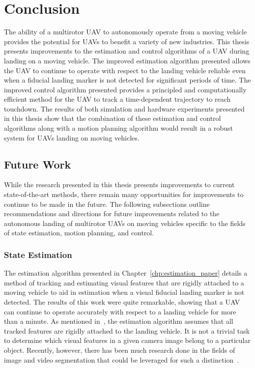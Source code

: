 
\chapter{Conclusion}
\label{chp:conclusion}

The ability of a multirotor UAV to autonomously operate from a moving vehicle
provides the potential for UAVs to benefit a variety of new industries. This
thesis presents improvements to the estimation and control algorithms of a UAV
during landing on a moving vehicle. The improved estimation algorithm presented
allows the UAV to continue to operate with respect to the landing vehicle
reliable even when a fiducial landing marker is not detected for significant
periods of time. The improved control algorithm presented provides a principled
and computationally efficient method for the UAV to track a time-dependent
trajectory to reach touchdown. The results of both simulation and hardware
experiments presented in this thesis show that the combination of these estimation and control
algorithms along with a motion planning algorithm would result in a robust
system for UAVs landing on moving vehicles.

\section{Future Work}
\label{sec:future_work}
While the research presented in this thesis presents improvements to current
state-of-the-art methods, there remain many opportunities for improvements to
continue to be made in the future. The following subsections outline
recommendations and directions for future improvements related to the autonomous
landing of multirotor UAVs on moving vehicles specific to the fields of state
estimation, motion planning, and control.

\subsection{State Estimation}
The estimation algorithm presented in Chapter~\ref{chp:estimation_paper} details
a method of tracking and estimating visual features that are rigidly attached to
a moving vehicle to aid in estimation when a visual fiducial landing marker is
not detected. The results of this work were quite remarkable, showing that a UAV
can continue to operate accurately with respect to a landing vehicle for more
than a minute. As mentioned in~, the estimation algorithm
assumes that all tracked features are rigidly attached to the landing vehicle.
It is not a trivial task to determine which visual features in a given camera
image belong to a particular object. Recently, however, there has been much research done
in the fields of image and video segmentation that could be leveraged for such a
distinction~\cite{chen2018encoder}. 

